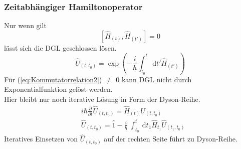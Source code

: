 \documentclass[10pt,article,colorback,accentcolor=tud9d]{scrartcl}
\begin{document}
\subsubsection{Zeitabhängiger Hamiltonoperator}
Nur wenn gilt 
\begin{equation}
\left[\hat{H}_{(t)},\hat{H}_{(t')}\right]=0
\label{eq:Kommutatorrelation2}
\end{equation}
lässt sich die DGL geschlossen lösen.
\begin{equation}
\hat{U}_{(t,t_0)}=\exp\left(-\frac{i}{\hbar}\int_{t_0}^t \ \text{d}t'\hat{H}_{(t')}\right)
\end{equation}
Für (\ref{eq:Kommutatorrelation2}) $\neq$ 0 kann DGL nicht durch Exponentialfunktion gelöst werden.\\
Hier bleibt nur noch iterative Lösung in Form der Dyson-Reihe.
\begin{align}
&i\hbar\frac{\partial}{\partial t} \hat{U}_{(t,t_0)}=\hat{H}_{(t)}\hat{U}_{(t,t_0)}\\
&\hat{U}_{(t,t_0)}=\hat{1}-\frac{i}{\hbar} \ \int^t_{t_0}\ \text{d}t_1\hat{H}_{t_1}\hat{U}_{(t_1,t_0)}
\end{align}
Iteratives Einsetzen von $\hat{U}_{(t,t_0)}$ auf der rechten Seite führt zu Dyson-Reihe.\\
\end{document}

